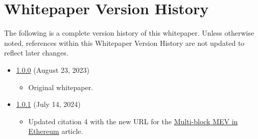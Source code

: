 \documentclass[tikz]{article}
\begin{document}
\section{Whitepaper Version History}

The following is a complete version history of this whitepaper. Unless otherwise noted, references within this Whitepaper Version History are not updated to reflect later changes.

\begin{itemize}[topsep=0pt, itemsep=3pt,leftmargin=16pt]
    \item \href{https://github.com/BeanstalkFarms/Multi-Flow-Pump-Whitepaper/blob/main/version-history/multi-flow-pump1_0_0.pdf}{1.0.0} (August 23, 2023)
    
    \begin{itemize}
        \item Original whitepaper.
    \end{itemize}
    
    \item \href{https://github.com/BeanstalkFarms/Multi-Flow-Pump-Whitepaper/blob/main/version-history/multi-flow-pump1_0_1.pdf}{1.0.1} (July 14, 2024)
    
    \begin{itemize}
        \item Updated citation 4 with the new URL for the  \href{https://www.alvarorevuelta.com/posts/ethereum-mev-multiblock}{Multi-block MEV in Ethereum} article.
    \end{itemize}
\end{itemize}
\end{document}
